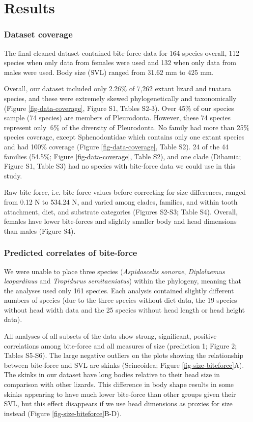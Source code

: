 \documentclass[a4paper, 12pt]{article}
\begin{document}
\section{Results}

\subsubsection{Dataset coverage}
The final cleaned dataset contained bite-force data for 164 species overall, 112 species when only data from females were used and 132 when only data from males were used. 
Body size (SVL) ranged from 31.62 mm to 425 mm.
 
Overall, our dataset included only 2.26\% of 7,262 extant lizard and tuatara species\cite{uetz2020reptile}, and these were extremely skewed phylogenetically and taxonomically (Figure \ref{fig-data-coverage}, Figure S1, Tables S2-3). 
Over 45\% of our species sample (74 species) are members of Pleurodonta. 
However, these 74 species represent only $~6$\% of the diversity of Pleurodonta. 
No family had more than 25\% species coverage, except Sphenodontidae which contains only one extant species and had 100\% coverage (Figure \ref{fig-data-coverage}, Table S2). 
24 of the 44 families (54.5\%; Figure \ref{fig-data-coverage}, Table S2), and one clade (Dibamia; Figure S1, Table S3) had no species with bite-force data we could use in this study. 

Raw bite-force, i.e. bite-force values before correcting for size differences, ranged from 0.12 N to 534.24 N, and varied among clades, families, and within tooth attachment, diet, and substrate categories (Figures S2-S3; Table S4). 
Overall, females have lower bite-forces and slightly smaller body and head dimensions than males (Figure S4).

\subsubsection{Predicted correlates of bite-force}
We were unable to place three species (\textit{Aspidoscelis sonorae}, \textit{Diplolaemus leopardinus} and \textit{Tropidurus semitaeniatus}) within the phylogeny, meaning that the analyses used only 161 species. 
Each analysis contained slightly different numbers of species (due to the three species without diet data, the 19 species without head width data and the 25 species without head length or head height data).

All analyses of all subsets of the data show strong, significant, positive correlations among bite-force and all measures of size (prediction 1; Figure 2; Tables S5-S6). 
The large negative outliers on the plots showing the relationship between bite-force and SVL are skinks (Scincoidea; Figure \ref{fig-size-biteforce}A). 
The skinks in our dataset have long bodies relative to their head size in comparison with other lizards. 
This difference in body shape results in some skinks appearing to have much lower bite-force than other groups given their SVL, but this effect disappears if we use head dimensions as proxies for size instead (Figure \ref{fig-size-biteforce}B-D).
\end{document}
